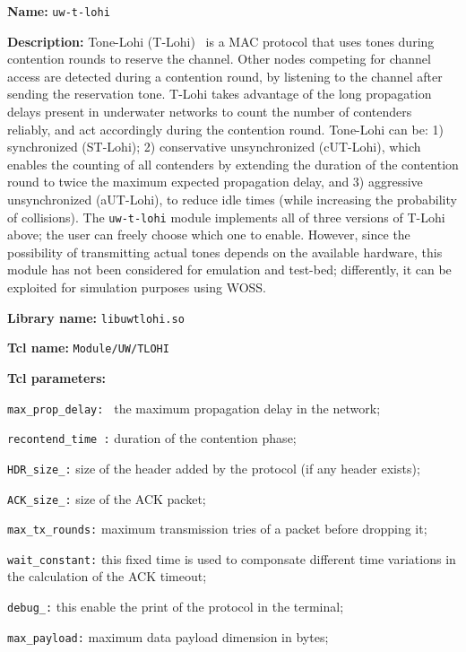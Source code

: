 \begin{description}
    \item {\bf Name:} {\tt uw-t-lohi}
    \item {\bf Description:}  Tone-Lohi (T-Lohi)~\cite{SyedPhoenix} is a MAC protocol that uses tones during contention rounds to reserve the channel. Other nodes competing for channel access are detected during a contention round, by listening to the channel after sending the reservation tone. T-Lohi takes advantage of the long propagation delays present in underwater networks to count the number of contenders reliably, and act accordingly during the contention round. Tone-Lohi can be: 1) synchronized (ST-Lohi); 2) conservative unsynchronized (cUT-Lohi), which enables the counting of all contenders by extending the duration of the contention round to twice the maximum expected propagation delay, and 3) aggressive unsynchronized (aUT-Lohi), to reduce idle times (while increasing the probability of collisions). The {\tt uw-t-lohi} module implements all of three versions of T-Lohi above; the user can freely choose which one  to enable. However, since the possibility of transmitting actual tones depends on the available hardware, this module has not been considered for emulation and test-bed; differently, it can be exploited for simulation purposes using WOSS.
    \item {\bf Library name:} {\tt libuwtlohi.so}
    \item {\bf Tcl name:}  
       {\tt Module/UW/TLOHI}
    \item {\bf Tcl parameters:} 
   	\begin{description}
		\item {\tt max\_prop\_delay: } the maximum propagation delay in the network;
		\item {\tt recontend\_time :} duration of the contention phase;
		\item {\tt HDR\_size\_:} size of the header added by the protocol (if any header exists);
		\item {\tt ACK\_size\_:} size of the ACK packet;
		\item {\tt max\_tx\_rounds:} maximum transmission tries of a packet before dropping it;
		\item {\tt wait\_constant:} this fixed time is used to componsate different time variations in the calculation of the ACK timeout;
		\item {\tt debug\_:} this enable the print of the protocol in the terminal;
		\item {\tt max\_payload:} maximum data payload dimension in bytes;

\end{description}
\end{description}
